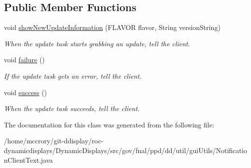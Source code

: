\subsection*{Public Member Functions}
\begin{DoxyCompactItemize}
\item 
\hypertarget{classgov_1_1fnal_1_1ppd_1_1dd_1_1util_1_1guiUtils_1_1NotificationClientText_ab4879ecf03b2d00f8d4e085c8bd41f0a}{void \hyperlink{classgov_1_1fnal_1_1ppd_1_1dd_1_1util_1_1guiUtils_1_1NotificationClientText_ab4879ecf03b2d00f8d4e085c8bd41f0a}{show\-New\-Update\-Information} (F\-L\-A\-V\-O\-R flavor, String version\-String)}\label{classgov_1_1fnal_1_1ppd_1_1dd_1_1util_1_1guiUtils_1_1NotificationClientText_ab4879ecf03b2d00f8d4e085c8bd41f0a}

\begin{DoxyCompactList}\small\item\em When the update task starts grabbing an update, tell the client. \end{DoxyCompactList}\item 
\hypertarget{classgov_1_1fnal_1_1ppd_1_1dd_1_1util_1_1guiUtils_1_1NotificationClientText_a60f0c1ad444844a27c015753fd23f54a}{void \hyperlink{classgov_1_1fnal_1_1ppd_1_1dd_1_1util_1_1guiUtils_1_1NotificationClientText_a60f0c1ad444844a27c015753fd23f54a}{failure} ()}\label{classgov_1_1fnal_1_1ppd_1_1dd_1_1util_1_1guiUtils_1_1NotificationClientText_a60f0c1ad444844a27c015753fd23f54a}

\begin{DoxyCompactList}\small\item\em If the update task gets an error, tell the client. \end{DoxyCompactList}\item 
\hypertarget{classgov_1_1fnal_1_1ppd_1_1dd_1_1util_1_1guiUtils_1_1NotificationClientText_a8de8c375474d901a6554bd3c39d4cf46}{void \hyperlink{classgov_1_1fnal_1_1ppd_1_1dd_1_1util_1_1guiUtils_1_1NotificationClientText_a8de8c375474d901a6554bd3c39d4cf46}{success} ()}\label{classgov_1_1fnal_1_1ppd_1_1dd_1_1util_1_1guiUtils_1_1NotificationClientText_a8de8c375474d901a6554bd3c39d4cf46}

\begin{DoxyCompactList}\small\item\em When the update task succeeds, tell the client. \end{DoxyCompactList}\end{DoxyCompactItemize}


The documentation for this class was generated from the following file\-:\begin{DoxyCompactItemize}
\item 
/home/mccrory/git-\/ddisplay/roc-\/dynamicdisplays/\-Dynamic\-Displays/src/gov/fnal/ppd/dd/util/gui\-Utils/Notification\-Client\-Text.\-java\end{DoxyCompactItemize}
